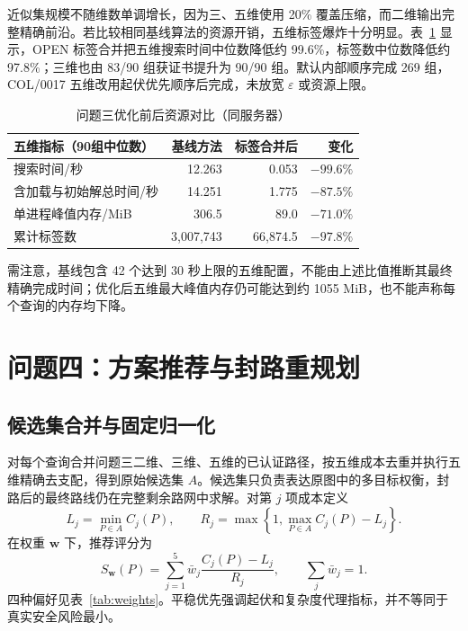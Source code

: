 \documentclass[UTF8,a4paper]{ctexart}
\newcommand{\eps}{\varepsilon}
\begin{document}
近似集规模不随维数单调增长，因为三、五维使用 20\% 覆盖压缩，而二维输出完整精确前沿。若比较相同基线算法的资源开销，五维标签爆炸十分明显。表~\ref{tab:q3perf} 显示，OPEN 标签合并把五维搜索时间中位数降低约 99.6\%，标签数中位数降低约 97.8\%；三维也由 83/90 组获证书提升为 90/90 组。默认内部顺序完成 269 组，COL/0017 五维改用起伏优先顺序后完成，未放宽 $\eps$ 或资源上限。

\begin{table}[H]
\centering
\caption{问题三优化前后资源对比（同服务器）}
\label{tab:q3perf}
\begin{tabular}{lrrr}
\toprule
五维指标（90组中位数） & 基线方法 & 标签合并后 & 变化 \\
\midrule
搜索时间/秒 & 12.263 & 0.053 & $-99.6\%$ \\
含加载与初始解总时间/秒 & 14.251 & 1.775 & $-87.5\%$ \\
单进程峰值内存/MiB & 306.5 & 89.0 & $-71.0\%$ \\
累计标签数 & 3,007,743 & 66,874.5 & $-97.8\%$ \\
\bottomrule
\end{tabular}
\end{table}

需注意，基线包含 42 个达到 30 秒上限的五维配置，不能由上述比值推断其最终精确完成时间；优化后五维最大峰值内存仍可能达到约 1055 MiB，也不能声称每个查询的内存均下降。

\section{问题四：方案推荐与封路重规划}

\subsection{候选集合并与固定归一化}

对每个查询合并问题三二维、三维、五维的已认证路径，按五维成本去重并执行五维精确去支配，得到原始候选集 $A$。候选集只负责表达原图中的多目标权衡，封路后的最终路线仍在完整剩余路网中求解。对第 $j$ 项成本定义
\begin{equation}
L_j=\min_{P\in A}C_j(P),\qquad
R_j=\max\left\{1,\max_{P\in A}C_j(P)-L_j\right\}.
\end{equation}
在权重 $\bm w$ 下，推荐评分为
\begin{equation}
S_{\bm w}(P)=\sum_{j=1}^5\bar w_j\frac{C_j(P)-L_j}{R_j},
\qquad \sum_j\bar w_j=1.\label{eq:score}
\end{equation}
四种偏好见表~\ref{tab:weights}。平稳优先强调起伏和复杂度代理指标，并不等同于真实安全风险最小。
\end{document}

